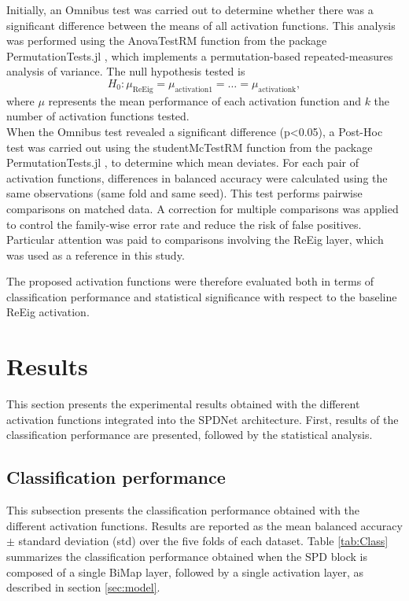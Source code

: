 \documentclass[11pt,a4paper]{article}
\begin{document}
\noindent Initially, an Omnibus test was carried out to determine whether there was a significant difference between the means of all activation functions. This analysis was performed using the AnovaTestRM function from the package PermutationTests.jl \cite{test}, which implements a permutation-based repeated-measures analysis of variance. The null hypothesis tested is \[ 
H_0: \mu_{\text{ReEig}} = \mu_{\text{activation1}} = \dots = \mu_{\text{activationk}},\] where $\mu$ represents the mean performance of each activation function and $k$ the number of activation functions tested. \\
\noindent When the Omnibus test revealed a significant difference (p<0.05), a Post-Hoc test was carried out using the studentMcTestRM function from the package PermutationTests.jl \cite{test}, to determine which mean deviates. For each pair of activation functions, differences in balanced accuracy were calculated using the same observations (same fold and same seed). This test performs pairwise comparisons on matched data. A correction for multiple comparisons was applied to control the family-wise error rate and reduce the risk of false positives. Particular attention was paid to comparisons involving the ReEig layer, which was used as a reference in this study.

\noindent The proposed activation functions were therefore evaluated both in terms of classification performance and statistical significance with respect to the baseline ReEig activation.




\newpage
\section{Results}
This section presents the experimental results obtained with the different activation functions integrated into the SPDNet architecture.  First, results of the classification performance are presented, followed by the statistical analysis. 

\subsection{Classification performance}
This subsection presents the classification performance obtained with the different activation functions. Results are reported as the mean balanced accuracy $\pm$ standard deviation (std) over the five folds of each dataset. Table \ref{tab:Class} summarizes the classification performance obtained when the SPD block is composed of a single BiMap layer, followed by a single activation layer, as described in section \ref{sec:model}.
\end{document}
